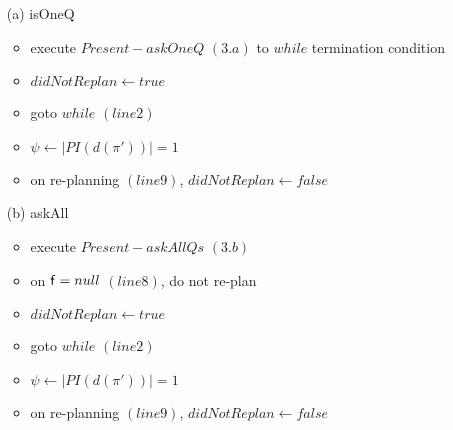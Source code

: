 \documentclass[letterpaper]{article}
\begin{document}
\begin{itemize}
  \item[(a)] isOneQ
  \begin{itemize}
    \item execute $Present-askOneQ$ $(3.a)$ to $while$ termination condition
    \item $didNotReplan \leftarrow true$
    \item goto $while$ $(line 2)$
    \item $\psi \leftarrow |PI(d(\pi'))| = 1$
    \item on re-planning $(line 9)$, $didNotReplan \leftarrow false$
  \end{itemize}
  \item[(b)] askAll
  \begin{itemize}
    \item execute $Present-askAllQs$ $(3.b)$ 
    \item on ${\sf f} = null $ $(line 8)$, do not re-plan
	\item $didNotReplan \leftarrow true$
    \item goto $while$ $(line 2)$
    \item $\psi \leftarrow |PI(d(\pi'))| = 1$
    \item on re-planning $(line 9)$, $didNotReplan \leftarrow false$
  \end{itemize}
\end{itemize}
\ \\


% 
% 
% 	
\end{document}
